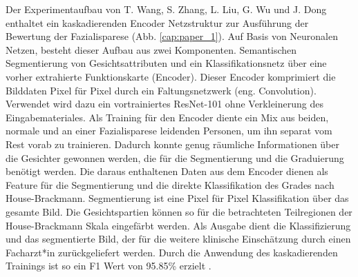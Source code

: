 Der Experimentaufbau von T. Wang, S. Zhang, L. Liu, G. Wu und J. Dong enthaltet ein kaskadierenden Encoder Netzstruktur zur Ausführung der Bewertung der Fazialisparese (Abb. \ref{cap:paper_1}). Auf Basis von Neuronalen Netzen, besteht dieser Aufbau aus zwei Komponenten. Semantischen Segmentierung von Gesichtsattributen und ein Klassifikationsnetz über eine vorher extrahierte Funktionskarte (Encoder). Dieser Encoder komprimiert die Bilddaten Pixel für Pixel durch ein Faltungsnetzwerk (eng. Convolution). Verwendet wird dazu ein vortrainiertes ResNet-101 ohne Verkleinerung des Eingabemateriales. Als Training für den Encoder diente ein Mix aus beiden, normale und an einer Fazialisparese leidenden Personen, um ihn separat vom Rest vorab zu trainieren. Dadurch konnte genug räumliche Informationen über die Gesichter gewonnen werden, die für die Segmentierung und die Graduierung benötigt werden. Die daraus enthaltenen Daten aus dem Encoder dienen als Feature für die Segmentierung und die direkte Klassifikation des Grades nach House-Brackmann. Segmentierung ist eine Pixel für Pixel Klassifikation über das gesamte Bild. Die Gesichtspartien können so für die betrachteten Teilregionen der House-Brackmann Skala eingefärbt werden. Als Ausgabe dient die Klassifizierung und das segmentierte Bild, der für die weitere klinische Einschätzung durch einen Facharzt*in zurückgeliefert werden. Durch die Anwendung des kaskadierenden Trainings ist so ein F1 Wert von 95.85\% erzielt \cite{detection_fp2}.



